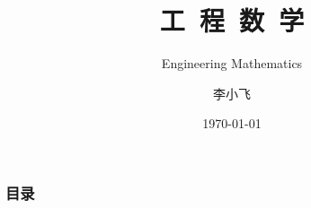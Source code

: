 \documentclass[12pt,UTF8,aspectratio=169]{beamer}
\begin{document}

\author{\myfont 李小飞}
\title{\textbf{\Huge 工~程~数~学}}
\subtitle{Engineering Mathematics}
\date{\today}

    \frame[plain]{\titlepage}
   \begin{frame}
        \frametitle{目录}
        \tableofcontents
    \end{frame}


%
%
%
%  
%  
%  
\end{document}
